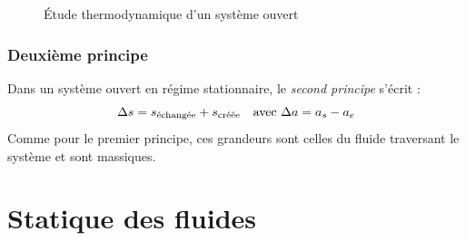 \documentclass[11pt,a4paper,fleqn,pdftex]{report}
\begin{document}
\begin{figure}
{
   }
   \caption{Étude thermodynamique d'un système ouvert}
   \label{fig:systeme_ouvert}
\end{figure}
\subsection{Deuxième principe} %
\label{sub:deuxieme_principe}
\begin{itheorem}
   Dans un système ouvert en régime stationnaire, le \emph{second principe} s'écrit : 
   \begin{equation}
   \Delta s = s_\text{échangée}+s_\text{créée}\\ \quad\text{avec }\Delta a = a_s - a_e
   \end{equation}
   Comme pour le premier principe, ces grandeurs sont celles du fluide traversant le système et sont massiques. 
\end{itheorem}
%
\chapter{Statique des fluides} %
\label{cha:statique_des_fluides}
\end{document}
